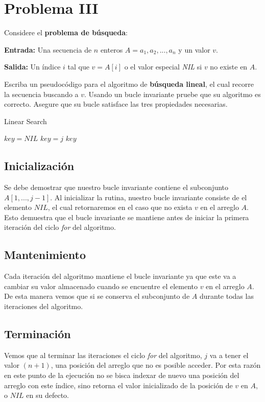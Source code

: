 \section{Problema III}
Considere el \textbf{problema de búsqueda}:
    
\textbf{Entrada:} Una secuencia de $n$ enteros $A = {a_1, a_2, ..., a_n}$ y un valor $v$.

\textbf{Salida:} Un índice $i$ tal que $v = A[i]$ o el valor especial \textit{NIL} si $v$ no existe en $A$.

Escriba un pseudocódigo para el algoritmo de \textbf{búsqueda lineal}, el cual recorre la secuencia buscando a $v$. Usando un bucle invariante pruebe que su algoritmo es correcto. Asegure que su bucle satisface las tres propiedades necesarias.

\begin{algorithm}[H]
    \caption{Linear Search}\label{alg:linear_search}
    \begin{algorithmic}[1]
            \State $key = NIL$
                    \State $key = j$
                \EndIf\label{linear_search_if}
            \EndFor\label{isort_for}
            \Return $key$
        \EndProcedure
    \end{algorithmic}
\end{algorithm}

\subsection{Inicialización}
Se debe demostrar que nuestro bucle invariante contiene el subconjunto $A[1, ..., j-1]$. Al inicializar la rutina, nuestro bucle invariante consiste de el elemento $NIL$, el cual retornaremos en el caso que no exista $v$ en el arreglo $A$. Esto demuestra que el bucle invariante se mantiene antes de iniciar la primera iteración del ciclo \textit{for} del algoritmo.

\subsection{Mantenimiento}
Cada iteración del algoritmo mantiene el bucle invariante ya que este va a cambiar su valor almacenado cuando se encuentre el elemento $v$
 en el arreglo $A$. De esta manera vemos que si se conserva el subconjunto de $A$ durante todas las iteraciones del algoritmo.
 
\subsection{Terminación}
Vemos que al terminar las iteraciones el ciclo \textit{for} del algoritmo, $j$ va a tener el valor $(n+1)$, una posición del arreglo que no es posible acceder. Por esta razón en este punto de la ejecución no se bisca indexar de nuevo una posición del arreglo con este índice, sino retorna el valor inicializado de la posición de $v$ en $A$, o $NIL$ en su defecto.